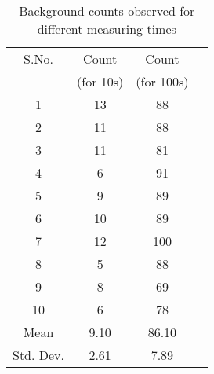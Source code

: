 \begin{table}[H]
    \centering
    \begin{tabular}{|c|c|c|c|}\hline
        S.No. & Count & Count \\
         & (for 10s) & (for 100s) \\\hline
        1 & 13 & 88 \\
        2 & 11 & 88 \\
        3 & 11 & 81 \\
        4 & 6 & 91 \\
        5 & 9 & 89 \\
        6 & 10 & 89 \\
        7 & 12 & 100 \\
        8 & 5 & 88 \\
        9 & 8 & 69 \\
        10 & 6 & 78 \\\hline
        Mean & 9.10 & 86.10 \\\hline
        Std. Dev. & 2.61 & 7.89 \\\hline
    \end{tabular}
    \caption{Background counts observed for different measuring times}
    \label{t6}
\end{table}